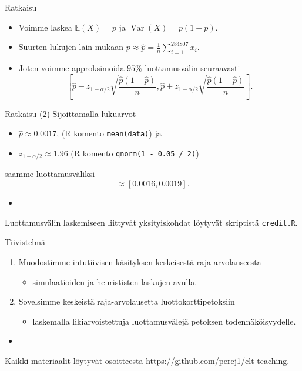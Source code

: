\documentclass{beamer}
\DeclareMathOperator{\var}{Var}
\begin{document}

\begin{frame}{Ratkaisu}
  \begin{itemize}
    \item Voimme laskea $\mathbb{E}\left(X\right) = p$ ja $\var\left(X\right) =
    p(1-p)$.
    \item Suurten lukujen lain mukaan $p \approx \hat p =
    \frac{1}{n}\sum_{i=1}^{284807} x_i$.
    \item Joten voimme approksimoida $95\%$ luottamusvälin seuraavasti
    \begin{equation*}
      \left[\hat p - z_{1 - \alpha/2}\sqrt{\frac{\hat p(1-\hat p)}{n}},
      \hat p + z_{1 - \alpha/2}\sqrt{\frac{\hat p(1-\hat p)}{n}}\right].
    \end{equation*}
  \end{itemize}
\end{frame}


\begin{frame}{Ratkaisu (2)}
  Sijoittamalla lukuarvot
  \begin{itemize}
    \item $\hat p\approx 0.0017$, (\textsf{R} komento \texttt{mean(data)}) ja
    \item $z_{1 - \alpha / 2} \approx 1.96$ (\textsf{R} komento \texttt{qnorm(1
    - 0.05 / 2)})
  \end{itemize}
  saamme luottamusväliksi
  \begin{equation*}
    \approx \left[0.0016, 0.0019\right].
  \end{equation*}
  \pause
  \begin{itemize}
    \item[]
  \end{itemize}
  Luottamusvälin laskemiseen liittyvät yksityiskohdat löytyvät skriptistä
  \texttt{credit.R}. 
\end{frame}

\begin{frame}{Tiivistelmä}
  \begin{enumerate}
    \item Muodostimme intutiivisen käsityksen keskeisestä raja-arvolauseesta
    \begin{itemize}
      \item simulaatioiden ja heurististen laskujen avulla.
    \end{itemize}
    \pause
    \item Sovelsimme keskeistä raja-arvolausetta luottokorttipetoksiin
    \begin{itemize}
      \item laskemalla likiarvoistettuja luottamusvälejä petoksen
      todennäköisyydelle.
    \end{itemize}
  \end{enumerate}
  \begin{itemize}
    \item[]
  \end{itemize}
  \pause
  Kaikki materiaalit löytyvät osoitteesta
  \url{https://github.com/perej1/clt-teaching}.
\end{frame}
\end{document}

